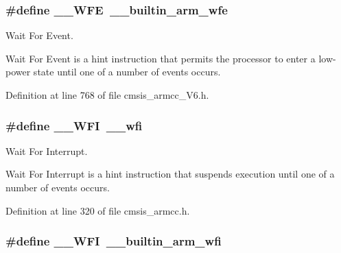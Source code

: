 \subsubsection[{\texorpdfstring{\+\_\+\+\_\+\+W\+FE}{__WFE}}]{\setlength{\rightskip}{0pt plus 5cm}\#define \+\_\+\+\_\+\+W\+FE~\+\_\+\+\_\+builtin\+\_\+arm\+\_\+wfe}\hypertarget{group___c_m_s_i_s___core___instruction_interface_gaac6cc7dd4325d9cb40d3290fa5244b3d}{}\label{group___c_m_s_i_s___core___instruction_interface_gaac6cc7dd4325d9cb40d3290fa5244b3d}


Wait For Event. 

Wait For Event is a hint instruction that permits the processor to enter a low-\/power state until one of a number of events occurs. 

Definition at line 768 of file cmsis\+\_\+armcc\+\_\+\+V6.\+h.

\subsubsection[{\texorpdfstring{\+\_\+\+\_\+\+W\+FI}{__WFI}}]{\setlength{\rightskip}{0pt plus 5cm}\#define \+\_\+\+\_\+\+W\+FI~\+\_\+\+\_\+wfi}\hypertarget{group___c_m_s_i_s___core___instruction_interface_gad23bf2b78a9a4524157c9de0d30b7448}{}\label{group___c_m_s_i_s___core___instruction_interface_gad23bf2b78a9a4524157c9de0d30b7448}


Wait For Interrupt. 

Wait For Interrupt is a hint instruction that suspends execution until one of a number of events occurs. 

Definition at line 320 of file cmsis\+\_\+armcc.\+h.

\subsubsection[{\texorpdfstring{\+\_\+\+\_\+\+W\+FI}{__WFI}}]{\setlength{\rightskip}{0pt plus 5cm}\#define \+\_\+\+\_\+\+W\+FI~\+\_\+\+\_\+builtin\+\_\+arm\+\_\+wfi}\hypertarget{group___c_m_s_i_s___core___instruction_interface_gad23bf2b78a9a4524157c9de0d30b7448}{}\label{group___c_m_s_i_s___core___instruction_interface_gad23bf2b78a9a4524157c9de0d30b7448}


